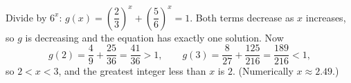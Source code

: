 Divide by $6^x$: $g(x)=\left(\dfrac{2}{3}\right)^x+\left(\dfrac{5}{6}\right)^x=1$. Both terms decrease as $x$ increases, so $g$ is decreasing and the equation has exactly one solution. Now
\[
g(2)=\dfrac{4}{9}+\dfrac{25}{36}=\dfrac{41}{36}>1,\qquad g(3)=\dfrac{8}{27}+\dfrac{125}{216}=\dfrac{189}{216}<1,
\]
so $2<x<3$, and the greatest integer less than $x$ is $\boxed{2}$. (Numerically $x\approx2.49$.)
